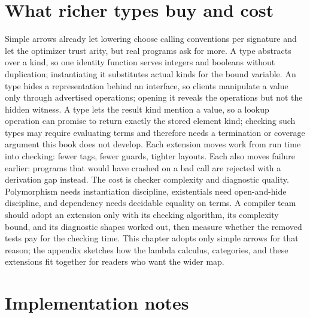 \section{What richer types buy and cost}
\label{sec:ch39-richer}

Simple arrows already let lowering choose calling conventions per signature and let the optimizer trust arity, but real programs ask for more.
A  type abstracts over a kind, so one identity function serves integers and booleans without duplication; instantiating it substitutes actual kinds for the bound variable.
An  type hides a representation behind an interface, so clients manipulate a value only through advertised operations; opening it reveals the operations but not the hidden witness.
A  type lets the result kind mention a value, so a lookup operation can promise to return exactly the stored element kind; checking such types may require evaluating terms and therefore needs a termination or coverage argument this book does not develop.
Each extension moves work from run time into checking: fewer tags, fewer guards, tighter layouts.
Each also moves failure earlier: programs that would have crashed on a bad call are rejected with a derivation gap instead.
The cost is checker complexity and diagnostic quality.
Polymorphism needs instantiation discipline, existentials need open-and-hide discipline, and dependency needs decidable equality on terms.
A compiler team should adopt an extension only with its checking algorithm, its complexity bound, and its diagnostic shapes worked out, then measure whether the removed tests pay for the checking time.
This chapter adopts only simple arrows for that reason; the appendix sketches how the lambda calculus, categories, and these extensions fit together for readers who want the wider map.

\section{Implementation notes}
\label{sec:ch39-implementation}

